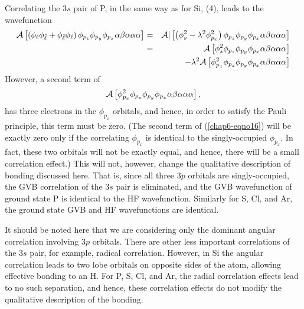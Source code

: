 Correlating the $3s$ pair of P, in the same way as for Si, (4), leads 
to the wavefunction
\begin{eqnarray}
{\cal A} \left[ \left( \phi_{\ell} \phi_{\bar{\ell}} + 
\phi_{\bar{\ell}} \phi_{\ell} \right) \phi_{p_z} \phi_{p_y} 
\phi_{p_x} \alpha \beta \alpha \alpha \alpha \right] &=& {\cal A}| 
\left[ \left( \phi^2_s - \lambda^2 \phi^2_{p_x} \right) \phi_{p_z} 
\phi_{p_y} \phi_{p_x} \alpha \beta \alpha \alpha \alpha \right]\cr
&=& {\cal A} \left[ \phi^2_s \phi_{p_z} 
\phi_{p_y} \phi_{p_x} \alpha \beta \alpha \alpha \alpha \right]\cr
&& - \lambda^2 {\cal A} \left[ \phi^2_{p_x} \phi_{p_z} 
\phi_{p_y} \phi_{p_x} \alpha \beta \alpha \alpha \alpha 
\right]
\label{chap6-eqno16}
\end{eqnarray}
However, a second term of
\begin{equation}
{\cal A} \left[ \phi^2_{p_x} \phi_{p_z} 
\phi_{p_y} \phi_{p_x} \alpha \beta \alpha \alpha \alpha \right] ,
\end{equation}
has three electrons in the $\phi_{p_x}$ orbitals, and hence, in order
to satisfy the Pauli principle, this term must be zero.  (The second
term of (\ref{chap6-eqno16}) will be exactly zero only if the
correlating $\phi_{p_x}$ is identical to the singly-occupied
$\phi_{p_x}$.  In fact, these two orbitals will not be exactly equal,
and hence, there will be a small correlation effect.)  This will not,
however, change the qualitative description of bonding discussed here.
That is, since all three $3p$ orbitals are singly-occupied, the
GVB correlation of the $3s$ pair is eliminated,
and the GVB wavefunction of ground state P is
identical to the HF wavefunction.  Similarly for S, Cl, and
Ar, the ground state GVB and HF
wavefunctions are identical.

It should be noted here that we are considering only the dominant 
angular correlation involving $3p$ orbitals.  There are other less 
important correlations of the $3s$ pair, for example, radical 
correlation.  However, in Si the angular correlation leads to two lobe 
orbitals on opposite sides of the atom, allowing effective bonding to 
an H.  For P, S, Cl, and Ar, the radial correlation effects lead to 
no such separation, and hence, these correlation effects do not modify 
the qualitative description of the bonding.

